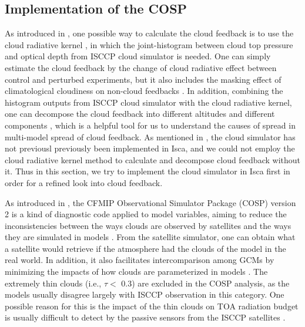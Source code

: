 \subsection{Implementation of the COSP}
\label{sec:implementation_of_cosp}

As introduced in , one possible way to calculate the cloud feedback is to use the cloud radiative kernel \citep{Zelinka2012computing1,Zelinka2012computing2}, in which the joint-histogram between cloud top pressure and optical depth from ISCCP cloud simulator \citep{Klein1999validation,Webb2001combining} is needed. One can simply estimate the cloud feedback by the change of cloud radiative effect between control and perturbed experiments, but it also includes the masking effect of climatological cloudiness on non-cloud feedbacks \citep{Soden2004}. In addition, combining the histogram outputs from ISCCP cloud simulator with the cloud radiative kernel, one can decompose the cloud feedback into  different altitudes and different components \citep{Zelinka2012computing2,Zelinka2016insights}, which is a helpful tool for us to understand the causes of spread in multi-model spread of cloud feedback. As mentioned in , the cloud simulator has not previousl previously been implemented in Isca, and we could not employ the cloud radiative kernel method to calculate and decompose cloud feedback without it. Thus in this section, we try to implement the cloud simulator in Isca first in order for a refined look into cloud feedback.

As introduced in , the CFMIP Observational Simulator Package (COSP) version 2 \citep{Swales2018} is a kind of diagnostic code applied to model variables, aiming to reduce the inconsistencies between the ways clouds are observed by satellites and the ways they are simulated in models \citep{BodasSalcedo2011}. From the satellite simulator, one can obtain what a satellite would retrieve if the atmosphere had the clouds of the model in the real world. In addition, it also facilitates intercomparison among GCMs by minimizing the impacts of how clouds are parameterized in models \citep[e.g.][]{Klein2013climate}. The extremely thin clouds (i.e., $\tau<$ 0.3) are excluded in the COSP analysis, as the models usually disagree largely with ISCCP observation in this category. One possible reason for this is the impact of the thin clouds on TOA radiation budget is usually difficult to detect by the passive sensors from the ISCCP satellites \citep{Klein2013climate}.

